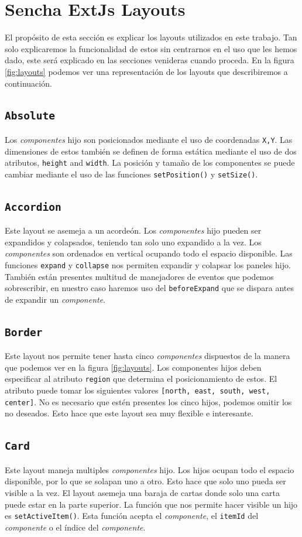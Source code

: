 \section{Sencha ExtJs Layouts}
	El propósito de esta sección es explicar los layouts utilizados en este trabajo. Tan solo explicaremos la funcionalidad de estos sin
	centrarnos en el uso que les hemos dado, este será explicado en las secciones venideras cuando proceda. En la figura \ref{fig:layouts} podemos
	ver una representación de los layouts que describiremos a continuación.
	\subsection{\texttt{Absolute}}
		Los \emph{componentes} hijo son posicionados mediante el uso de coordenadas \texttt{X,Y}. Las dimensiones de estos también se definen
		de forma estática mediante el uso de dos atributos, \texttt{height} and \texttt{width}. La posición y tamaño de los componentes se
		puede cambiar mediante el uso de las funciones \texttt{setPosition()} y \texttt{setSize()}.
	\subsection{\texttt{Accordion}}
		Este layout se asemeja a un acordeón. Los \emph{componentes} hijo pueden ser expandidos y colapsados, teniendo tan solo uno expandido
		a la vez. Los \emph{componentes} son ordenados en vertical ocupando todo el espacio disponible. Las funciones \texttt{expand} y
		\texttt{collapse} nos permiten expandir y colapsar los paneles hijo. También están presentes multitud de manejadores de eventos que
		podemos sobrescribir, en nuestro caso haremos uso del \texttt{beforeExpand} que se dispara antes de expandir un \emph{componente}. 
	\subsection{\texttt{Border}}
		Este layout nos permite tener hasta cinco \emph{componentes} dispuestos de la manera que podemos ver en la figura \ref{fig:layouts}.
		Los componentes hijos deben especificar al atributo \texttt{region} que determina el posicionamiento de estos. El atributo puede tomar
		los siguientes valores \texttt{[north, east, south, west, center]}. No es necesario que estén presentes los cinco hijos, podemos
		omitir los no deseados. Esto hace que este layout sea muy flexible e interesante.
	\subsection{\texttt{Card}}
		Este layout maneja multiples \emph{componentes} hijo. Los hijos ocupan todo el espacio disponible, por lo que se solapan uno a otro.
		Esto hace que solo uno pueda ser visible a la vez. El layout asemeja una baraja de cartas donde solo una carta puede estar en la parte
		superior. La función que nos permite hacer visible un hijo es \texttt{setActiveItem()}. Esta función acepta el \emph{componente}, el
		\texttt{itemId} del \emph{componente} o el índice del \emph{componente}.
